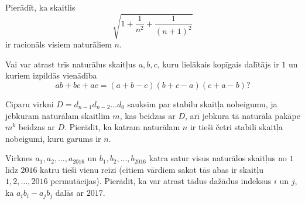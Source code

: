 \documentclass[11pt]{article}
\begin{document}
\begin{problem}[BW.TST.2017.13]
Pierādīt, ka skaitlis 
\[ \sqrt{1 + \frac{1}{n^2} + \frac{1}{(n+1)^2}} \]
ir racionāls visiem naturāliem $n$. 
\end{problem}

\begin{problem}[BW.TST.2017.14]
Vai var atrast trīs naturālus skaitļus $a,b,c$, kuru lielākais kopīgais dalītājs ir $1$
un kuriem izpildās vienādība
\[ ab + bc+ac = (a+b-c)(b+c-a)(c+a-b)? \]
\end{problem}

\begin{problem}[BW.TST.2017.15]
Ciparu virkni $D = d_{n-1}d_{n-2}\ldots{}d_0$ sauksim par stabilu skaitļa nobeigumu, 
ja jebkuram naturālam skaitlim $m$, kas beidzas ar $D$, arī jebkura tā naturāla pakāpe $m^k$
beidzas ar $D$. Pierādīt, ka katram naturālam $n$ ir tieši četri stabili skaitļa nobeigumi, 
kuru garums ir $n$. 
\end{problem}

\begin{problem}[BW.TST.2017.16]
Virknes $a_1,a_2,\ldots,a_{2016}$ un $b_1,b_2,\ldots,b_{2016}$ katra satur visus naturālos 
skaitļus no $1$ līdz $2016$ katru tieši vienu reizi 
(citiem vārdiem sakot tās abas ir skaitļu $1,2,\ldots,2016$ permutācijas). 
Pierādīt, ka var atrast tādus dažādus indeksus $i$ un $j$, ka $a_ib_i - a_jb_j$ dalās ar $2017$.
\end{problem}
\end{document}
